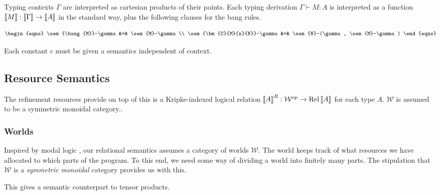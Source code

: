 Typing contexts $\Gamma$ are interpreted as cartesian products of their points.
Each typing derivation $\Gamma \vdash M : A$ is interpreted as a function
$\left\llbracket M \right\rrbracket : \left\llbracket \Gamma \right\rrbracket \to \left\llbracket A \right\rrbracket$ in the standard way, plus the following
clauses for the bang rules.

\begin{displaymath}
  \begin{eqns}
    \sem{\bang{M}}~\gamma &=& \sem{M}~\gamma \\
    \sem{\bm{C}{M}{x}{N}}~\gamma &=& \sem{N}~(\gamma, \sem{M}~\gamma)
  \end{eqns}
\end{displaymath}

Each constant $c$ must be given a semantics independent of
context.

\subsection{Resource Semantics}

The refinement resources provide on top of this is a Kripke-indexed logical
relation $\left\llbracket A \right\rrbracket^R : \mathcal{W}^{op} \to \operatorname{Rel}\left\llbracket A \right\rrbracket$ for each type $A$.
$\mathcal{W}$ is assumed to be a symmetric monoidal category..


\subsubsection{Worlds}

Inspired by modal logic , our relational semantics assumes a category
of worlds $\mathcal W$.
The world keeps track of what resources we have allocated to which parts of the
program.
To this end, we need some way of dividing a world into finitely many parts.
The stipulation that $\mathcal W$ is a \emph{symmetric monoidal}
category provides us with this.

This gives a semantic counterpart to tensor products.


